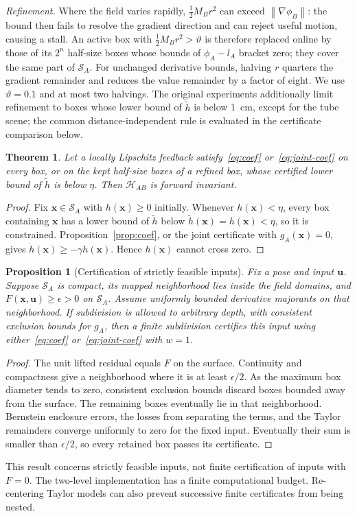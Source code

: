 \documentclass[journal]{IEEEtran}
\newtheorem{theorem}{Theorem}
\newtheorem{proposition}{Proposition}
\theoremstyle{definition}
\newcommand{\norm}[1]{\left\lVert #1\right\rVert}
\begin{document}
\emph{Refinement.} Where the field varies rapidly, $\frac12M_Br^2$ can exceed
$\norm{\nabla\phi_B}$: the bound then fails to resolve the gradient direction and can reject useful
motion, causing a stall. An active box
with $\frac12M_Br^2>\vartheta$ is therefore replaced online by those of its $2^n$ half-size boxes whose
bounds of $\phi_A-l_A$ bracket zero; they cover the same part of $\mathcal S_A$.
For unchanged derivative bounds, halving $r$ quarters the gradient remainder and reduces the
value remainder by a factor of eight. We use $\vartheta=0.1$ and at most two halvings.
The original experiments additionally limit refinement to boxes whose lower bound of $\tilde h$
is below 1~cm, except for the tube scene; the common distance-independent rule is evaluated
in the certificate comparison below.
\begin{theorem}\label{thm:invariance}
Let a locally Lipschitz feedback satisfy~\eqref{eq:coef} or~\eqref{eq:joint-coef} on every box, or on the kept half-size boxes of
a refined box, whose certified lower bound of $\tilde h$ is below $\eta$. Then $\mathcal H_{AB}$ is
forward invariant.
\end{theorem}
\begin{proof}
Fix $\mathbf x\in\mathcal S_A$ with $h(\mathbf x)\ge0$ initially. Whenever $h(\mathbf x)<\eta$, every
box containing $\mathbf x$ has a lower bound of $\tilde h$ below $\tilde h(\mathbf x)=h(\mathbf x)<\eta$,
so it is constrained. Proposition~\ref{prop:coef}, or the joint certificate with $g_A(\mathbf x)=0$, gives
$\dot h(\mathbf x)\ge-\gamma h(\mathbf x)$. Hence
$h(\mathbf x)$ cannot cross zero.
\end{proof}

\begin{proposition}[Certification of strictly feasible inputs]\label{prop:complete}
Fix a pose and input $\mathbf u$. Suppose $\mathcal S_A$ is compact, its mapped neighborhood lies
inside the field domains, and $F(\mathbf x,\mathbf u)\ge\epsilon>0$ on $\mathcal S_A$.
Assume uniformly bounded derivative majorants on that neighborhood. If subdivision is allowed
to arbitrary depth, with consistent exclusion bounds for $g_A$, then a finite subdivision
certifies this input using either~\eqref{eq:coef} or~\eqref{eq:joint-coef} with $w=1$.
\end{proposition}
\begin{proof}
The unit lifted residual equals $F$ on the surface. Continuity and compactness give a neighborhood
where it is at least $\epsilon/2$. As the maximum box diameter tends to zero, consistent exclusion
bounds discard boxes bounded away from the surface. The remaining boxes eventually lie in that
neighborhood. Bernstein enclosure errors, the losses from separating the terms, and the Taylor
remainders converge uniformly to zero for the fixed input. Eventually their sum is smaller than
$\epsilon/2$, so every retained box passes its certificate.
\end{proof}
This result concerns strictly feasible inputs, not finite certification of inputs with $F=0$.
The two-level implementation has a finite computational budget. Re-centering Taylor models can
also prevent successive finite certificates from being nested.
\end{document}
